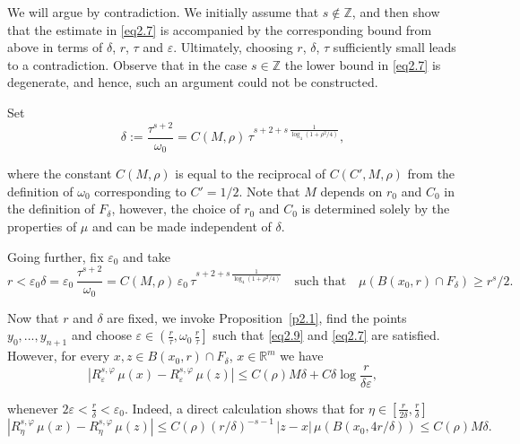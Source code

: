 \documentclass{elsart3-1}
\newcommand{\RR}{{\mathbb{R}}}
\newcommand{\ZZ}{{\mathbb{Z}}}
\newcommand{\eps}{\varepsilon}
\begin{document}
We will argue by contradiction. We initially assume that $s\not\in \ZZ$, and then show that the estimate in \eqref{eq2.7} is accompanied by the corresponding bound from above in terms of $\delta$, $r$, $\tau$ and $\eps$. Ultimately, choosing $r$, $\delta$, $\tau$ sufficiently small leads to a contradiction. Observe that in the case $s\in\ZZ$ the lower bound in \eqref{eq2.7} is degenerate, and hence, such an argument could not be constructed.

Set 
\begin{equation}\label{eq3.1}
\delta:=\frac{\tau^{s+2}}{\omega_0}=C(M,\rho)\, \tau^{s+2+s\,\frac {1}{\log_4(1+\rho^2/4)}},
\end{equation}

\noindent where the constant $C(M,\rho)$ is equal to the reciprocal of $C(C',M,\rho)$ from the definition of $\omega_0$ corresponding to $C'=1/2$. Note that $M$ depends on $r_0$ and $C_0$ in the definition of $F_\delta$, however, the choice of $r_0$ and $C_0$ is determined solely by the properties of $\mu$ and can be made independent of $\delta$.

Going further, fix $\eps_0$ and take 
\begin{equation}\label{eq3.2}
r<\eps_0\delta=\eps_0\,\frac{\tau^{s+2}}{\omega_0}=C(M,\rho)\,\eps_0\, \tau^{s+2+s\,\frac {1}{\log_4(1+\rho^2/4)}}
\quad \mbox{such that} \quad \mu(B(x_0,r)\cap F_\delta)\geq r^s/2.\end{equation}

Now that $r$ and $\delta$ are fixed, we invoke Proposition~\ref{p2.1}, find the points $y_0,..., y_{n+1}$  and choose $\eps\in \left(\frac r\tau,\omega_0\,\frac r\tau\right]$ such that \eqref{eq2.9} and \eqref{eq2.7} are satisfied. However,  for every $x,z\in B(x_0, r)\cap F_{\delta}$, $x\in \RR^m$ we have
\begin{equation}\label{eq3.4}
|R^{s,\varphi}_{\eps}\,\mu(x)-R^{s,\varphi}_{\eps}\,\mu(z)|\leq C(\rho)M \delta + C \delta \log \frac {r}{\delta\eps},
\end{equation}

\noindent whenever  $2\eps<\frac r\delta<\eps_0$. Indeed, a direct calculation shows that for $\eta\in\left[\frac{r}{2\delta},\frac{r}{\delta}\right]$
\begin{equation}\label{eq3.6}
|R^{s,\varphi}_{\eta}\,\mu(x)-R^{s,\varphi}_{\eta}\,\mu(z)|\leq C(\rho)\left(r/\delta\right)^{-s-1}\, |z-x| \,\mu(B(x_0, 4r/\delta))\leq C(\rho)M \delta.
\end{equation}
\end{document}
